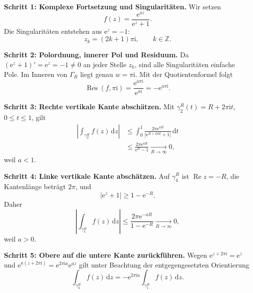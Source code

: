 \documentclass[11pt,a4paper]{article}
\newcommand{\Z}{\mathbb Z}
\newcommand{\ii}{\mathrm i}
\newcommand{\ee}{\mathrm e}
\newcommand{\dd}{\,\mathrm d}
\newcommand{\Res}{\operatorname{Res}}
\newcommand{\Ree}{\operatorname{Re}}
\newcommand{\Imm}{\operatorname{Im}}
\newcommand{\1}{\mathbf 1}
\begin{document}
{\begin{beispielbox}[title={Vorgerechnetes Prüfungsbeispiel: Aufgabe 12 (2025) -- uneigentliches Integral mit Rechteckkontur}]
\begin{center}
\end{center}

\textbf{Schritt 1: Komplexe Fortsetzung und Singularitäten.}
Wir setzen
\[
f(z)=\frac{\ee^{az}}{\ee^z+1}.
\]
Die Singularitäten entstehen aus $\ee^z=-1$:
\[
z_k=(2k+1)\pi\ii,\qquad k\in\Z.
\]

\textbf{Schritt 2: Polordnung, innerer Pol und Residuum.}
Da $(\ee^z+1)'=\ee^z=-1\neq0$ an jeder Stelle $z_k$, sind alle
Singularitäten einfache Pole. Im Inneren von $\Gamma_R$ liegt genau
$w=\pi\ii$. Mit der Quotientenformel folgt
\[
\Res(f,\pi\ii)
=\frac{\ee^{a\pi\ii}}{\ee^{\pi\ii}}
=-\ee^{a\pi\ii}.
\]

\textbf{Schritt 3: Rechte vertikale Kante abschätzen.}
Mit $\gamma_2^R(t)=R+2\pi\ii t$, $0\leq t\leq1$, gilt
\[
\begin{aligned}
\left|\int_{\gamma_2^R}f(z)\dd z\right|
&\leq \int_0^1
\frac{2\pi\ee^{aR}}{|\ee^{R+2\pi\ii t}+1|}\dd t\\
&\leq\frac{2\pi\ee^{aR}}{\ee^R-1}
\xrightarrow[R\to\infty]{}0,
\end{aligned}
\]
weil $a<1$.

\textbf{Schritt 4: Linke vertikale Kante abschätzen.}
Auf $\gamma_4^R$ ist $\Ree z=-R$, die Kantenlänge beträgt $2\pi$, und
\[
|\ee^z+1|\geq1-\ee^{-R}.
\]
Daher
\[
\left|\int_{\gamma_4^R}f(z)\dd z\right|
\leq\frac{2\pi\ee^{-aR}}{1-\ee^{-R}}
\xrightarrow[R\to\infty]{}0,
\]
weil $a>0$.

\textbf{Schritt 5: Obere auf die untere Kante zurückführen.}
Wegen $\ee^{z+2\pi\ii}=\ee^z$ und
$\ee^{a(z+2\pi\ii)}=\ee^{2\pi\ii a}\ee^{az}$ gilt unter Beachtung der
entgegengesetzten Orientierung
\[
\int_{\gamma_3^R}f(z)\dd z
=-\ee^{2\pi\ii a}\int_{\gamma_1^R}f(z)\dd z.
\]


\end{beispielbox}}
\end{document}
